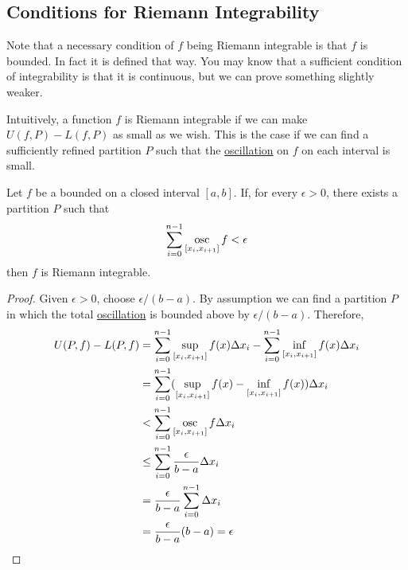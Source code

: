 \subsection{Conditions for Riemann Integrability}

  Note that a necessary condition of $f$ being Riemann integrable is that $f$ is bounded. In fact it is defined that way. You may know that a sufficient condition of integrability is that it is continuous, but we can prove something slightly weaker. 

  Intuitively, a function $f$ is Riemann integrable if we can make $U(f, P) - L(f, P)$ as small as we wish. This is the case if we can find a sufficiently refined partition $P$ such that the \hyperref[def:oscillation]{oscillation} on $f$ on each interval is small. 

  \begin{lemma}
    \label{thm:functions-with-vanishing-osillations-are}
    Let $f$ be a bounded on a closed interval $[a, b]$. If, for every $\epsilon > 0$, there exists a partition $P$ such that
    \begin{equation}
      \sum_{i=0}^{n-1} \mathop{\operatorname{osc}}_{[x_i, x_{i+1}]} f < \epsilon
    \end{equation}
    then $f$ is Riemann integrable. 
  \end{lemma}
  \begin{proof}
    Given $\epsilon > 0$, choose $\epsilon/(b-a)$. By assumption we can find a partition $P$ in which the total \hyperref[def:oscillation]{oscillation} is bounded above by $\epsilon/(b-a)$. Therefore, 
    \begin{align}
      U(P, f) - L(P, f) & = \sum_{i=0}^{n-1} \sup_{[x_i, x_{i+1}]} f(x) \Delta x_i - \sum_{i=0}^{n-1} \inf_{[x_i, x_{i+1}]} f(x) \Delta x_i \\ 
                        & = \sum_{i=0}^{n-1} (\sup_{[x_i, x_{i+1}]} f(x) - \inf_{[x_i, x_{i+1}]} f(x) ) \Delta x_i \\ 
                        & < \sum_{i=0}^{n-1} \mathop{\operatorname{osc}}_{[x_i, x_{i+1}]} f \Delta x_i \\ 
                        & \leq \sum_{i=0}^{n-1} \frac{\epsilon}{b-a} \Delta x_i \\ 
                        & = \frac{\epsilon}{b-a} \sum_{i=0}^{n-1} \Delta x_i \\
                        & = \frac{\epsilon}{b-a} (b-a) = \epsilon
    \end{align}
  \end{proof} 

